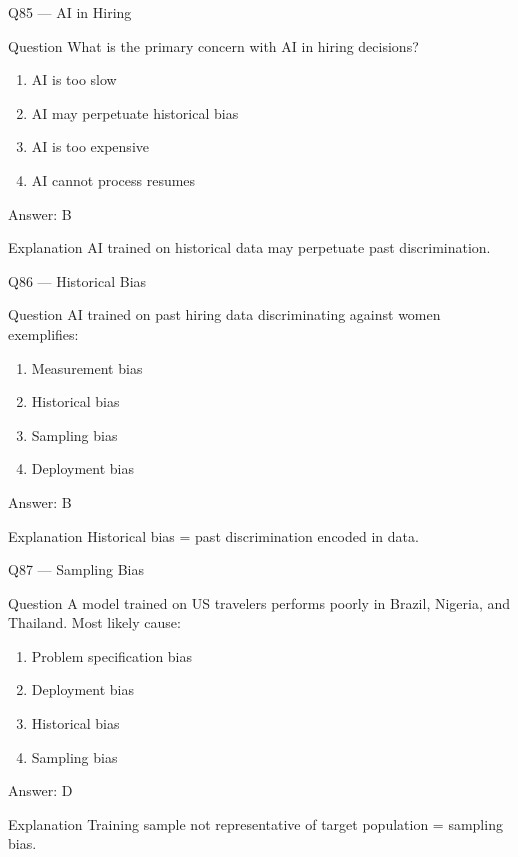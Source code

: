 \documentclass[aspectratio=169,8pt]{beamer}
\begin{document}
	\begin{frame}{Q85 --- AI in Hiring}
		\begin{block}{Question}
			What is the primary concern with AI in hiring decisions?
		\end{block}
		\begin{enumerate}
			\item AI is too slow
			\item AI may perpetuate historical bias
			\item AI is too expensive
			\item AI cannot process resumes
		\end{enumerate}
		\begin{exampleblock}{Answer: B}\end{exampleblock}
		\begin{block}{Explanation}
			AI trained on historical data may perpetuate past discrimination.
		\end{block}
	\end{frame}
	
	\begin{frame}{Q86 --- Historical Bias}
		\begin{block}{Question}
			AI trained on past hiring data discriminating against women exemplifies:
		\end{block}
		\begin{enumerate}
			\item Measurement bias
			\item Historical bias
			\item Sampling bias
			\item Deployment bias
		\end{enumerate}
		\begin{exampleblock}{Answer: B}\end{exampleblock}
		\begin{block}{Explanation}
			Historical bias = past discrimination encoded in data.
		\end{block}
	\end{frame}
	
	\begin{frame}{Q87 --- Sampling Bias}
		\begin{block}{Question}
			A model trained on US travelers performs poorly in Brazil, Nigeria, and Thailand. Most likely cause:
		\end{block}
		\begin{enumerate}
			\item Problem specification bias
			\item Deployment bias
			\item Historical bias
			\item Sampling bias
		\end{enumerate}
		\begin{exampleblock}{Answer: D}\end{exampleblock}
		\begin{block}{Explanation}
			Training sample not representative of target population = sampling bias.
		\end{block}
	\end{frame}
	
\end{document}
